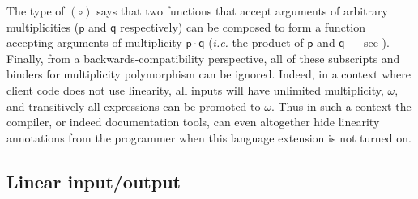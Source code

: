 \documentclass[acmsmall,screen]{acmart}\settopmatter{}
\newcommand{\Varid}[1]{\mathit{#1}}
\renewcommand\Varid[1]{\mathord{\textsf{#1}}}
\newcommand{\ie}{\textit{i.e.}\xspace}
\begin{document}
The type of \ensuremath{(\mathbin{∘})} says that two functions that accept arguments of arbitrary
multiplicities (\ensuremath{\Varid{p}} and \ensuremath{\Varid{q}} respectively) can be composed to form a
function accepting arguments of multiplicity \ensuremath{\Varid{p}\mathbin{·}\Varid{q}} (\ie the
product of \ensuremath{\Varid{p}} and \ensuremath{\Varid{q}} --- see ).
%
Finally, from a backwards-compatibility perspective, all of these
subscripts and binders for multiplicity polymorphism can be
ignored. Indeed, in a context where client code does not use
linearity, all inputs will have unlimited multiplicity, $ω$, and transitively all
expressions can be promoted to $ω$. Thus in such a context the
compiler, or indeed documentation tools, can even altogether hide
linearity annotations from the programmer when this language
extension is not turned on.

\subsection{Linear input/output} \label{sec:linear-io}
\end{document}
